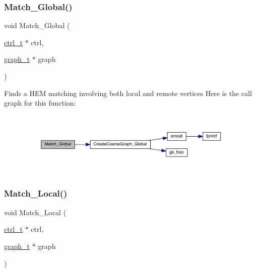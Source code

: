 \mbox{\label{a00951_a52c5a0edb61660b28b0b90629a76adea}} 
\subsubsection{\texorpdfstring{Match\+\_\+\+Global()}{Match\_Global()}}
{\footnotesize\ttfamily void Match\+\_\+\+Global (\begin{DoxyParamCaption}\item[{\hyperlink{a00742}{ctrl\+\_\+t} $\ast$}]{ctrl,  }\item[{\hyperlink{a00734}{graph\+\_\+t} $\ast$}]{graph }\end{DoxyParamCaption})}

Finds a H\+EM matching involving both local and remote vertices Here is the call graph for this function\+:\nopagebreak
\begin{figure}[H]
\begin{center}
\leavevmode
\includegraphics[width=350pt]{a00951_a52c5a0edb61660b28b0b90629a76adea_cgraph}
\end{center}
\end{figure}
\mbox{\label{a00951_a590439d0c0ae8d57d32bbd468b283345}} 
\subsubsection{\texorpdfstring{Match\+\_\+\+Local()}{Match\_Local()}}
{\footnotesize\ttfamily void Match\+\_\+\+Local (\begin{DoxyParamCaption}\item[{\hyperlink{a00742}{ctrl\+\_\+t} $\ast$}]{ctrl,  }\item[{\hyperlink{a00734}{graph\+\_\+t} $\ast$}]{graph }\end{DoxyParamCaption})}

